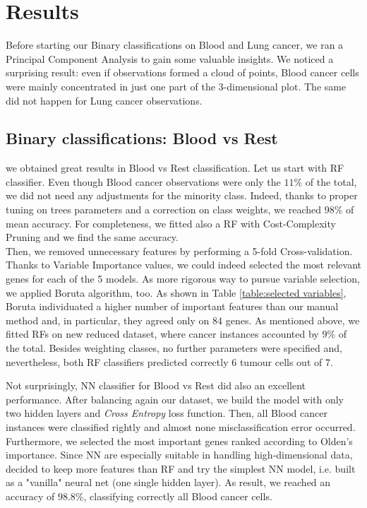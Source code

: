 \documentclass[a4paper,11pt, oneside]{article}  %
\begin{document}
\section{Results}
Before starting our Binary classifications on Blood and Lung cancer, we ran a Principal Component Analysis to gain some valuable insights. We noticed a surprising result: even if observations formed a cloud of points, Blood cancer cells were mainly concentrated in just one part of the 3-dimensional plot. The same did not happen for Lung cancer observations.

\subsection{Binary classifications: Blood vs Rest}
we obtained great results in Blood vs Rest classification.
Let us start with RF classifier. Even though Blood cancer observations were only the $11\%$ of the total, we did not need any adjustments for the minority class. Indeed, thanks to proper tuning on trees parameters and a correction on class weights, we reached $98\%$ of mean accuracy. For completeness, we fitted also a RF with Cost-Complexity Pruning and we find the same accuracy. \\
Then, we removed unnecessary features by performing a 5-fold Cross-validation. Thanks to Variable Importance values, we could indeed selected the most relevant genes for each of the 5 models. As more rigorous way to pursue variable selection, we applied Boruta algorithm, too. As shown in Table \ref{table:selected variables}, Boruta individuated a higher number of important features than our manual method and, in particular, they agreed only on $84$ genes. As mentioned above, we fitted RFs on new reduced dataset, where cancer instances accounted by $9\%$ of the total. Besides weighting classes, no further parameters were specified and, nevertheless, both RF classifiers predicted correctly $6$ tumour cells out of $7$.  

Not surprisingly, NN classifier for Blood vs Rest did also an excellent performance. After balancing again our dataset, we build the model with only two hidden layers and \textit{Cross Entropy} loss function. Then, all Blood cancer instances were classified rightly and almost none misclassification error occurred. \\
Furthermore, we selected the most important genes ranked according to Olden's importance. Since NN are especially suitable in handling high-dimensional data, decided to keep more features than RF and try the simplest NN model, i.e. built as a "vanilla" neural net (one single hidden layer). As result, we reached an accuracy of $98.8\%$, classifying correctly all Blood cancer cells.
\end{document}

